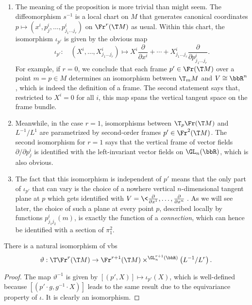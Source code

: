 \begin{rem}
    \begin{enumerate}
        \item The meaning of the proposition is more trivial than might seem. The diffeomorphism $s^{-1}$ is a local chart on $M$ that generates canonical coordinates $p\mapsto (x^i,p^i_j,\ldots,p^i_{j_1\ldots j_r})$ on $\Fr^r(\T M)$ as usual. Within this chart, the isomorphism $\iota_{p'}$ is given by the obvious map
        \[\iota_{p'}:\quad\left(X^i,\ldots,X^i_{j_1\ldots j_r}\right)\mapsto X^i\frac{\partial}{\partial x^i}+\cdots +X^i_{j_1\ldots j_r}\frac{\partial}{\partial p^i_{j_1\ldots j_r}}.\]
        For example, if $r=0$, we conclude that each frame $p'\in\Fr(\T M)$ over a point $m=p\in M$ determines an isomorphism between $\T_m M$ and $V\cong\bbR^n$, which is indeed the definition of a frame. The second statement says that, restricted to $X^i=0$ for all $i$, this map spans the vertical tangent space on the frame bundle. 

        \item Meanwhile, in the case $r=1$, isomorphisms between $\T_p \Fr(\T M)$ and $L^{-1}\slash L^1$ are parametrized by second-order frames $p'\in\Fr^2(\T M)$. The second isomorphism for $r=1$ says that the vertical frame of vector fields $\partial/\partial p^i_j$ is identified with the left-invariant vector fields on $\GL_n(\bbR)$, which is also obvious.
        \item The fact that this isomorphism is independent of $p'$ means that the only part of $\iota_{p'}$ that can vary is the choice of a nowhere vertical $n$-dimensional tangent plane at $p$ which gets identified with $V=\<\frac{\partial}{\partial x^1},\ldots,\frac{\partial}{\partial x^n}\>$. As we will see later, the choice of such a plane at every point $p$, described locally by functions $p^i_{j_1j_2}(m)$, is exactly the function of a \emph{connection}, which can hence be identified with a section of $\pi^2_1$.
    \end{enumerate} 
\end{rem}

\begin{cor}
    There is a natural isomorphism of \glspl{vb} 
    \[\vartheta:\T \Fr^r(\T M) \to \Fr^{r+1}(\T M)\times^{\GL_n^{r+1}(\bbR)}\left(L^{-1}\slash L^r\right).\]
\end{cor}
\begin{proof}
    The map $\vartheta^{-1}$ is given by $[(p',X)]\mapsto \iota_{p'}(X)$, which is well-defined because $[(p'\cdot g,g^{-1}\cdot X)]$ leads to the same result due to the equivariance property of $\iota$. It is clearly an isomorphism.
\end{proof}

